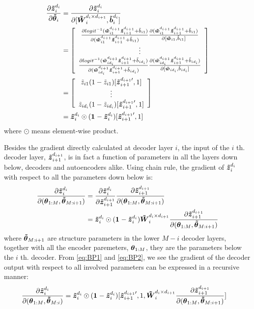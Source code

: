 \begin{equation}\label{eq:BP1}
\begin{split}
  \PDV{\oDi}{\pDC_i} &= \PDV{\oDi}{[\WDi, \bDi]} \\
  &= \left[\begin{array}{c}
      \PDV{logit^{-1}(\wDC_{i1  }^{d_{i+1}} \zDC_{i+1}^{d_{i+1}} + \tilde{b}_{i1  })} {(\wDC_{i1  }^{d_{i+1}} \zDC_{i+1}^{d_{i+1}} + \tilde{b}_{i1  })}
      \PDV{(\wDC_{i1}^{d_{i+1}} \zDC_{i+1}^{d_{i+1}} + \tilde{b}_{i1})}{[\wDC_{i1}, \tilde{b}_{i1}]} \\
      \vdots \\
      \PDV{logit^{-1}(\wDC_{id_i}^{d_{i+1}} \zDC_{i+1}^{d_{i+1}} + \tilde{b}_{id_i})} {(\wDC_{id_i}^{d_{i+1}} \zDC_{i+1}^{d_{i+1}} + \tilde{b}_{id_i})}
      \PDV{(\wDC_{id_i}^{d_{i+1}} \zDC_{i+1}^{d_{i+1}} + \tilde{b}_{id_i})}{[\wDC_{id_i}, \tilde{b}_{id_i}]} \\
    \end{array} \right] \\
  &= \left[\begin{array}{c}
      \tilde{z}_{i1  }(1-\tilde{z}_{i1  }) [\zDC_{i+1}^{d_{i+1}\prime}, 1] \\
      \vdots \\
      \tilde{z}_{id_i}(1-\tilde{z}_{id_i}) [\zDC_{i+1}^{d_{i+1}\prime}, 1] \\
    \end{array} \right] \\
  &= \oDi \odot (\one{} - \oDi) [\zDC_{i+1}^{d_{i+1}\prime}, 1] \\
\end{split}
\end{equation}
where $\odot$ means element-wise product. 

Besides the gradient directly calculated at decoder layer $i$, the input of the $i$ th. decoder layer, $\iDi$, is in fact a function of parameters in all the layers down below, decoders and autoencoders alike. Using chain rule, the gradient of $\oDi$ with respect to all the parameters down below is:
\begin{equation}\label{eq:BP2}
\begin{split}
  \PDV{\oDi}{(\pEC_{1:M}, \pDC_{M:i+1})}
  &= \PDV{\oDi}{\iDi} \PDV{\iDi}{(\pEC_{1:M}, \pDC_{M:i+1})} \\
  &= \oDi \odot (\one{} - \oDi) \WDi \PDV{\iDi}{(\pEC_{1:M}, \pDC_{M:i+1})}
\end{split}
\end{equation}
where $\pDC_{M:i+1}$ are structure parameters in the lower $M-i$ decoder layers, together with all the encoder paremeters, $\pEC_{1:M}$, they are the parameters below the $i$ th. decoder. From \ref{eq:BP1} and \ref{eq:BP2}, we see the gradient of the decoder output with respect to all involved parameters can be expressed in a recursive manner:
\begin{equation*}
\begin{split}
  \PDV{\oDi}{(\pEC_{1:M}, \pDC_{M:i})} &= \oDi \odot (\one{} - \oDi) [\zDC_{i+1}^{d_{i+1}\prime}, 1, \WDi \PDV{\iDi}{(\pEC_{1:M}, \pDC_{M:i+1})}]
\end{split}
\end{equation*}

